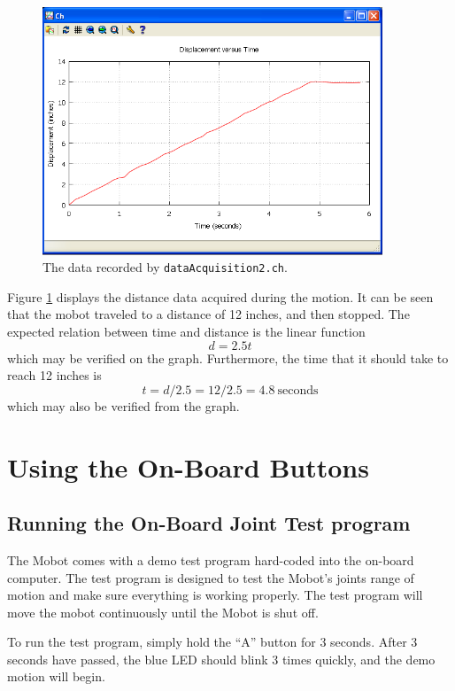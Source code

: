 \documentclass{article}
\begin{document}
\begin{figure}[H]
\centering
\includegraphics[width=4in]{images/dataacq3_plot1.png}
\caption{\label{fig:dataacq3_fig1} The data recorded by \texttt{dataAcquisition2.ch}.}
\end{figure}

Figure \ref{fig:dataacq3_fig1} displays the distance data acquired during the motion. It can
be seen that the mobot traveled to a distance of 12 inches, and then stopped. The
expected relation between time and distance is the linear function 
\begin{equation*}
d = 2.5t
\end{equation*}
which may be verified on the graph. Furthermore, the time that it should take to reach 
12 inches is 
\begin{equation}
t = d / 2.5 = 12 / 2.5 = 4.8 ~\text{seconds}
\end{equation}
which may also be verified from the graph.

\section{Using the On-Board Buttons}
\subsection{Running the On-Board Joint Test program}
The Mobot comes with a demo test program hard-coded into the on-board
computer. The test program is designed to test the Mobot's joints range of 
motion and make sure everything is working properly. The test program will
move the mobot continuously until the Mobot is shut off.

To run the test program, simply hold the ``A'' button for 3 seconds. After
3 seconds have passed, the blue LED should blink 3 times quickly, and the
demo motion will begin.
\end{document}
